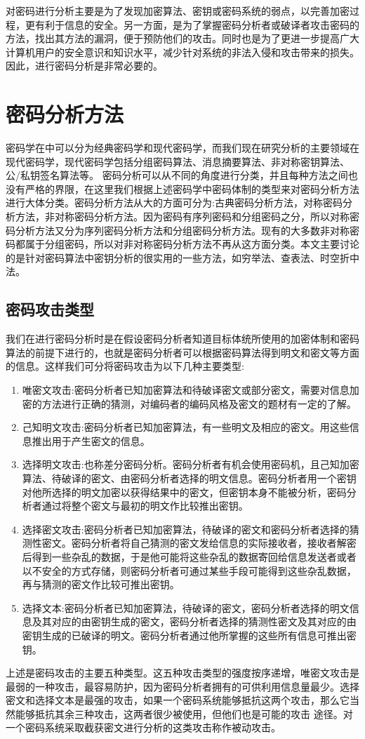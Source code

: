 对密码进行分析主要是为了发现加密算法、密钥或密码系统的弱点，以完善加密过程，更有利于信息的安全。另一方面，是为了掌握密码分析者或破译者攻击密码的方法，找出其方法的漏洞，便于预防他们的攻击。同时也是为了更进一步提高广大计算机用户的安全意识和知识水平，减少针对系统的非法入侵和攻击带来的损失。因此，进行密码分析是非常必要的。

\section{密码分析方法}
\label{sec:2.4}
密码学在\cite{feng02}中可以分为经典密码学和现代密码学，而我们现在研究分析的主要领域在现代密码学，现代密码学包括分组密码算法、消息摘要算法、非对称密钥算法、公/私钥签名算法等。
密码分析可以从不同的角度进行分类，并且每种方法之间也没有严格的界限，在这里我们根据上述密码学中密码体制的类型来对密码分析方法进行大体分类。密码分析方法从大的方面可分为:古典密码分析方法，对称密码分析方法，非对称密码分析方法。因为密码有序列密码和分组密码之分，所以对称密码分析方法又分为序列密码分析方法和分组密码分析方法。现有的大多数非对称密码都属于分组密码，所以对非对称密码分析方法不再从这方面分类。本文主要讨论的是针对密码算法中密钥分析的很实用的一些方法，如穷举法、查表法、时空折中法。
\subsection{密码攻击类型}
我们在进行密码分析时是在假设密码分析者知道目标体统所使用的加密体制和密码算法的前提下进行的，也就是密码分析者可以根据密码算法得到明文和密文等方面的信息。这样我们可分将密码攻击为以下几种主要类型:
\begin{enumerate}
\item 唯密文攻击:密码分析者已知加密算法和待破译密文或部分密文，需要对信息加密的方法进行正确的猜测，对编码者的编码风格及密文的题材有一定的了解。
\item 己知明文攻击:密码分析者已知加密算法，有一些明文及相应的密文。用这些信息推出用于产生密文的信息。
\item 选择明文攻击:也称差分密码分析。密码分析者有机会使用密码机，且己知加密算法、待破译的密文、由密码分析者选择的明文信息。密码分析者用一个密钥对他所选择的明文加密以获得结果中的密文，但密钥本身不能被分析，密码分析者通过将整个密文与最初的明文作比较推出密钥。
\item 选择密文攻击:密码分析者已知加密算法，待破译的密文和密码分析者选择的猜测性密文。密码分析者将自己猜测的密文发给信息的实际接收者，接收者解密后得到一些杂乱的数据，于是他可能将这些杂乱的数据寄回给信息发送者或者以不安全的方式存储，则密码分析者可通过某些手段可能得到这些杂乱数据，再与猜测的密文作比较可推出密钥。
\item 选择文本:密码分析者已知加密算法，待破译的密文，密码分析者选择的明文信息及其对应的由密钥生成的密文，密码分析者选择的猜测性密文及其对应的由密钥生成的已破译的明文。密码分析者通过他所掌握的这些所有信息可推出密钥。
\end{enumerate}
上述是密码攻击的主要五种类型。这五种攻击类型的强度按序递增，唯密文攻击是最弱的一种攻击，最容易防护，因为密码分析者拥有的可供利用信息量最少。选择密文和选择文本是最强的攻击，如果一个密码系统能够抵抗这两个攻击，那么它当然能够抵抗其余三种攻击，这两者很少被使用，但他们也是可能的攻击
途径。对一个密码系统采取截获密文进行分析的这类攻击称作被动攻击。

